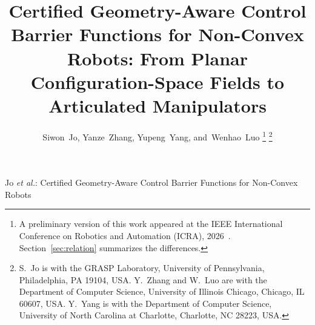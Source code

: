 \documentclass[journal]{IEEEtran}
\theoremstyle{definition}
\newif\ifanonymous
\begin{document}
\title{Certified Geometry-Aware Control Barrier Functions for Non-Convex Robots: From Planar
Configuration-Space Fields to Articulated Manipulators}

\ifanonymous
\author{Anonymous Authors}
\markboth{IEEE Transactions on Robotics}%
{Certified Geometry-Aware Control Barrier Functions for Non-Convex Robots}
\else
\author{Siwon~Jo, Yanze~Zhang, Yupeng~Yang, and~Wenhao~Luo%
\thanks{A preliminary version of this work appeared at the IEEE International Conference on
Robotics and Automation (ICRA), 2026~\cite{jo2026geometry}. Section~\ref{sec:relation}
summarizes the differences.}%
\thanks{S.~Jo is with the GRASP Laboratory, University of Pennsylvania, Philadelphia, PA 19104,
USA. Y.~Zhang and W.~Luo are with the Department of Computer Science, University of Illinois
Chicago, Chicago, IL 60607, USA. Y.~Yang is with the Department of Computer Science, University
of North Carolina at Charlotte, Charlotte, NC 28223, USA.}}

%
{Jo \MakeLowercase{\textit{et al.}}: Certified Geometry-Aware Control Barrier Functions for Non-Convex Robots}
\fi

\maketitle
\end{document}
